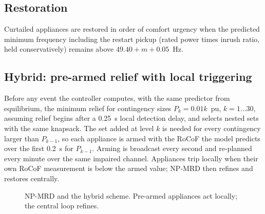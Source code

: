 \documentclass[conference]{IEEEtran}
\begin{document}
\subsection{Restoration}
Curtailed appliances are restored in order of comfort urgency when the predicted minimum frequency including the restart pickup (rated power times inrush ratio, held conservatively) remains above $49.40+m+0.05$~Hz.

\subsection{Hybrid: pre-armed relief with local triggering}
Before any event the controller computes, with the same predictor from equilibrium, the minimum relief for contingency sizes $P_k=0.01k$~pu, $k=1\ldots30$, assuming relief begins after a 0.25~s local detection delay, and selects nested sets with the same knapsack. The set added at level $k$ is needed for every contingency larger than $P_{k-1}$, so each appliance is armed with the RoCoF the model predicts over the first 0.2~s for $P_{k-1}$. Arming is broadcast every second and re-planned every minute over the same impaired channel. Appliances trip locally when their own RoCoF measurement is below the armed value; NP-MRD then refines and restores centrally.

\begin{figure}[t]
\centering
{}
\caption{NP-MRD and the hybrid scheme. Pre-armed appliances act locally; the central loop refines.}
\label{fig:arch}
\end{figure}
\end{document}
